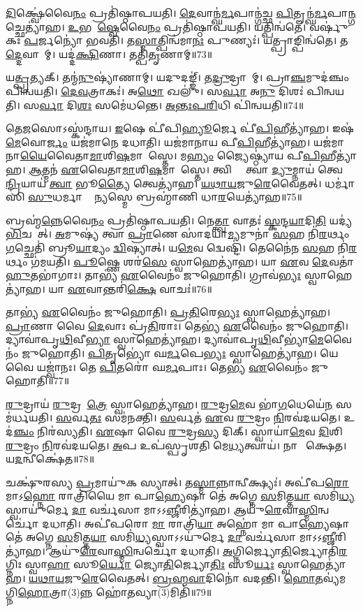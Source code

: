 \ul{𑌦𑌿}𑌕𑍍𑌷𑍍𑌵𑍇॑𑌵𑍈\ul{𑌨𑌂} 𑌪𑍍𑌰𑌤𑌿॑𑌷𑍍𑌠𑌾𑌪𑌯𑌤𑌿। 
\ul{𑌦𑍇}𑌵𑌾𑌨𑍍𑌘॑\ul{𑌰𑍍𑌮}𑌪𑌾𑌨𑍍𑌗॑𑌚𑍍𑌛 \ul{𑌪𑌿}𑌤𑍄𑌨𑍍𑌘॑\ul{𑌰𑍍𑌮}𑌪𑌾\ul{𑌨𑍍𑌗}𑌚𑍍𑌛𑍇\-𑌤𑍍𑌯𑌾॑𑌹। 
\ul{𑌉}𑌭𑌯𑍇᳚\ul{𑌷𑍍𑌵𑍇}𑌵𑍈\ul{𑌨𑌂} 𑌪𑍍𑌰𑌤𑌿॑𑌷𑍍𑌠𑌾𑌪𑌯𑌤𑌿। 
𑌯𑌤𑍍𑌪𑌿𑌨𑍍𑌵॑𑌤𑍇। 
𑌵𑌰𑍍\mbox{}𑌷𑍁॑𑌕𑌃 \ul{𑌪}𑌰𑍍𑌜𑌨𑍍𑌯𑍋॑ 𑌭𑌵𑌤𑌿। 
𑌤\ul{𑌸𑍍𑌮𑌾}𑌤𑍍𑌪𑌿𑌨𑍍𑌵॑𑌮𑌾\ul{𑌨𑌃} 𑌪𑍁𑌣𑍍𑌯𑌃॑। 
𑌯𑌤𑍍𑌪𑍍𑌰𑌾𑌙𑍍𑌪𑌿𑌨𑍍𑌵॑𑌤𑍇। 
𑌤\ul{𑌦𑍍𑌦𑍇}𑌵𑌾𑌨𑌾᳚𑌮𑍍। 
𑌯𑌦𑍍𑌦॑\ul{𑌕𑍍𑌷𑌿}𑌣𑌾। 
𑌤𑌤𑍍𑌪𑌿॑\ul{𑌤𑍃}𑌣𑌾𑌮𑍍॥73॥

𑌯\ul{𑌤𑍍𑌪𑍍𑌰}𑌤𑍍𑌯𑌕𑍍। 
𑌤𑌨𑍍𑌮॑\ul{𑌨𑍁}𑌷𑍍𑌯𑌾॑𑌣𑌾𑌮𑍍। 
𑌯𑌦𑍁𑌦𑌙𑍍𑌙𑍍॑। 
𑌤\ul{𑌦𑍍𑌰𑍁}𑌦𑍍𑌰𑌾𑌣𑌾᳚𑌮𑍍। 
𑌪𑍍𑌰𑌾\ul{𑌞𑍍𑌚}𑌮𑍁𑌦॑𑌞𑍍𑌚𑌂 𑌪𑌿𑌨𑍍𑌵𑌯𑌤𑌿। 
\ul{𑌦𑍇}\ul{𑌵}𑌤𑍍𑌰𑌾𑌕𑌃॑। 
𑌅\ul{𑌥𑍋} 𑌖𑌲𑍁॑। 
𑌸\ul{𑌰𑍍𑌵𑌾} 𑌅\ul{𑌨𑍁} 𑌦𑌿𑌶𑌃॑ 𑌪𑌿𑌨𑍍𑌵𑌯𑌤𑌿। 
𑌸\ul{𑌰𑍍𑌵𑌾} 𑌦𑌿\ul{𑌶𑌃} 𑌸𑌮𑍇॑𑌧𑌨𑍍𑌤𑍇। 
\ul{𑌅}\ul{𑌨𑍍𑌤𑌃}\ul{𑌪}\ul{𑌰𑌿}𑌧𑌿 𑌪𑌿॑𑌨𑍍𑌵𑌯𑌤𑌿॥74॥

𑌤𑍇\ul{𑌜}𑌸𑍋𑌽𑌸𑍍𑌕॑𑌨𑍍𑌦𑌾𑌯। 
\ul{𑌇}𑌷𑍇 𑌪𑍀॑𑌪𑌿\ul{𑌹𑍍𑌯𑍂}𑌰𑍍𑌜𑍇 𑌪𑍀॑\ul{𑌪𑌿}𑌹𑍀𑌤𑍍𑌯𑌾॑𑌹। 
𑌇𑌷॑\ul{𑌮𑍇}𑌵𑍋\ul{𑌰𑍍𑌜𑌂} 𑌯𑌜॑𑌮𑌾𑌨𑍇 𑌦𑌧𑌾𑌤𑌿। 
𑌯𑌜॑𑌮𑌾𑌨𑌾𑌯 𑌪𑍀\ul{𑌪𑌿}𑌹𑍀𑌤𑍍𑌯𑌾॑𑌹। 
𑌯𑌜॑𑌮𑌾𑌨𑌾\ul{𑌯𑍈}𑌵𑍈𑌤𑌾\ul{𑌮𑌾}𑌶𑌿\ul{𑌷}𑌮𑌾𑌶𑌾᳚𑌸𑍍𑌤𑍇। 
𑌮\ul{𑌹𑍍𑌯𑌂} 𑌜𑍍𑌯𑍈𑌷𑍍𑌠𑍍𑌯𑌾॑𑌯 𑌪𑍀\ul{𑌪𑌿}𑌹𑍀𑌤𑍍𑌯𑌾॑𑌹। 
\ul{𑌆}𑌤𑍍𑌮𑌨॑ \ul{𑌏}𑌵𑍈𑌤𑌾\ul{𑌮𑌾}𑌶𑌿\ul{𑌷}𑌮𑌾𑌶𑌾᳚𑌸𑍍𑌤𑍇। 
𑌤𑍍𑌵𑌿𑌷𑍍𑌯𑍈᳚ 𑌤𑍍𑌵𑌾 \ul{𑌦𑍍𑌯𑍁}𑌮𑍍𑌨𑌾𑌯॑ 𑌤𑍍𑌵𑍇\ul{𑌨𑍍𑌦𑍍𑌰𑌿}𑌯𑌾𑌯॑ \ul{𑌤𑍍𑌵𑌾} 𑌭𑍂\ul{𑌤𑍍𑌯𑍈} 𑌤𑍍𑌵𑍇𑌤𑍍𑌯𑌾॑𑌹। 
\ul{𑌯}\ul{𑌥𑌾}\ul{𑌯}𑌜𑍁\ul{𑌰𑍇}𑌵𑍈𑌤𑌤𑍍। 
𑌧𑌰𑍍𑌮𑌾॑𑌸𑌿 \ul{𑌸𑍁}𑌧𑌰𑍍𑌮𑌾 𑌮𑍇᳚ \ul{𑌨𑍍𑌯}𑌸𑍍𑌮𑍇 𑌬𑍍𑌰𑌹𑍍𑌮𑌾॑𑌣𑌿 𑌧𑌾\ul{𑌰}𑌯𑍇𑌤𑍍𑌯𑌾॑𑌹॥75॥

𑌬𑍍𑌰𑌹𑍍𑌮॑\ul{𑌨𑍍𑌨𑍇}𑌵𑍈\ul{𑌨𑌂} 𑌪𑍍𑌰𑌤𑌿॑𑌷𑍍𑌠𑌾𑌪𑌯𑌤𑌿। 
𑌨𑍇\ul{𑌤𑍍𑌤𑍍𑌵𑌾} 𑌵𑌾𑌤𑌃॑ \ul{𑌸𑍍𑌕}𑌨𑍍𑌦\ul{𑌯𑌾}𑌦𑌿\ul{𑌤𑌿} 𑌯𑌦𑍍𑌯॑\ul{𑌭𑌿}𑌚𑌰𑍇᳚𑌤𑍍। 
\ul{𑌅}𑌮𑍁𑌷𑍍𑌯॑ 𑌤𑍍𑌵𑌾 \ul{𑌪𑍍𑌰𑌾}𑌣𑍇 𑌸𑌾॑𑌦𑌯𑌾\ul{𑌮𑍍𑌯}𑌮𑍁𑌨𑌾॑ \ul{𑌸}𑌹 𑌨𑌿॑\ul{𑌰}𑌰𑍍𑌥𑌂 \ul{𑌗}𑌚𑍍𑌛𑍇𑌤𑌿॑ 𑌬𑍍𑌰𑍂\ul{𑌯𑌾}𑌦𑍍𑌯𑌂 \ul{𑌦𑍍𑌵𑌿}𑌷𑍍𑌯𑌾𑌤𑍍। 
𑌯\ul{𑌮𑍇}𑌵 𑌦𑍍𑌵𑍇𑌷𑍍𑌟𑌿॑। 
𑌤𑍇𑌨𑍈॑𑌨 \ul{𑌸}𑌹 𑌨𑌿॑\ul{𑌰}𑌰𑍍𑌥𑌂 𑌗॑𑌮𑌯𑌤𑌿। 
\ul{𑌪𑍂}𑌷𑍍𑌣𑍇 𑌶𑌰॑\ul{𑌸𑍇} 𑌸𑍍𑌵𑌾𑌹𑍇𑌤𑍍𑌯𑌾॑𑌹। 
𑌯𑌾 \ul{𑌏}𑌵 \ul{𑌦𑍇}𑌵𑌤𑌾॑ \ul{𑌹𑍁}𑌤𑌭𑌾॑𑌗𑌾𑌃। 
𑌤𑌾𑌭𑍍𑌯॑ \ul{𑌏}𑌵𑍈𑌨𑌂॑ 𑌜𑍁𑌹𑍋𑌤𑌿। 
𑌗𑍍𑌰𑌾𑌵॑\ul{𑌭𑍍𑌯𑌃} 𑌸𑍍𑌵𑌾𑌹𑍇𑌤𑍍𑌯𑌾॑𑌹। 
𑌯𑌾 \ul{𑌏}𑌵𑌾𑌨𑍍𑌤𑌰𑌿॑\ul{𑌕𑍍𑌷𑍇} 𑌵𑌾𑌚𑌃॑॥76॥

𑌤𑌾𑌭𑍍𑌯॑ \ul{𑌏}𑌵𑍈𑌨𑌂॑ 𑌜𑍁𑌹𑍋𑌤𑌿। 
\ul{𑌪𑍍𑌰}\ul{𑌤𑌿}𑌰𑍇\ul{𑌭𑍍𑌯𑌃} 𑌸𑍍𑌵𑌾𑌹𑍇𑌤𑍍𑌯𑌾॑𑌹। 
\ul{𑌪𑍍𑌰𑌾}𑌣𑌾 𑌵𑍈 \ul{𑌦𑍇}𑌵𑌾𑌃 𑌪𑍍𑌰॑\ul{𑌤𑌿}𑌰𑌾𑌃। 
𑌤𑍇𑌭𑍍𑌯॑ \ul{𑌏}𑌵𑍈𑌨𑌂॑ 𑌜𑍁𑌹𑍋𑌤𑌿। 
𑌦𑍍𑌯𑌾𑌵𑌾॑𑌪𑍃\ul{𑌥𑌿}𑌵𑍀\ul{𑌭𑍍𑌯𑌾}\ul{} 𑌸𑍍𑌵𑌾𑌹𑍇𑌤𑍍𑌯𑌾॑𑌹। 
𑌦𑍍𑌯𑌾𑌵𑌾॑𑌪𑍃\ul{𑌥𑌿}𑌵𑍀𑌭𑍍𑌯𑌾॑\ul{𑌮𑍇}𑌵𑍈𑌨𑌂॑ 𑌜𑍁𑌹𑍋𑌤𑌿। 
\ul{𑌪𑌿}𑌤𑍃𑌭𑍍𑌯𑍋॑ 𑌘\ul{𑌰𑍍𑌮}𑌪𑍇\ul{𑌭𑍍𑌯𑌃} 𑌸𑍍𑌵𑌾𑌹𑍇𑌤𑍍𑌯𑌾॑𑌹। 
𑌯𑍇 𑌵𑍈 𑌯𑌜𑍍𑌵𑌾॑𑌨𑌃। 
𑌤𑍇 \ul{𑌪𑌿}𑌤𑌰𑍋॑ 𑌘\ul{𑌰𑍍𑌮}𑌪𑌾𑌃। 
𑌤𑍇𑌭𑍍𑌯॑ \ul{𑌏}𑌵𑍈𑌨𑌂॑ 𑌜𑍁𑌹𑍋𑌤𑌿॥77॥

\ul{𑌰𑍁}𑌦𑍍𑌰𑌾𑌯॑ \ul{𑌰𑍁}𑌦𑍍𑌰𑌹𑍋᳚\ul{𑌤𑍍𑌰𑍇} 𑌸𑍍𑌵𑌾𑌹𑍇𑌤𑍍𑌯𑌾॑𑌹। 
\ul{𑌰𑍁}𑌦𑍍𑌰\ul{𑌮𑍇}𑌵 𑌭𑌾॑\ul{𑌗}𑌧𑍇𑌯𑍇॑\ul{𑌨} 𑌸𑌮॑𑌰𑍍𑌧𑌯𑌤𑌿। 
\ul{𑌸}𑌰𑍍𑌵\ul{𑌤𑌃} 𑌸𑌮॑𑌨𑌕𑍍𑌤𑌿। 
\ul{𑌸}𑌰𑍍𑌵𑌤॑ \ul{𑌏}𑌵 \ul{𑌰𑍁}𑌦𑍍𑌰𑌂 \ul{𑌨𑌿}𑌰𑌵॑𑌦𑌯𑌤𑍇। 
𑌉𑌦॑\ul{𑌞𑍍𑌚𑌂} 𑌨𑌿𑌰॑𑌸𑍍𑌯𑌤𑌿। 
\ul{𑌏}𑌷𑌾 𑌵𑍈 \ul{𑌰𑍁}𑌦𑍍𑌰\ul{𑌸𑍍𑌯} 𑌦𑌿𑌕𑍍। 
𑌸𑍍𑌵𑌾𑌯𑌾॑\ul{𑌮𑍇}𑌵 \ul{𑌦𑌿}𑌶𑌿 \ul{𑌰𑍁}𑌦𑍍𑌰𑌂 \ul{𑌨𑌿}𑌰𑌵॑𑌦𑌯𑌤𑍇। 
\ul{𑌅}𑌪 𑌉𑌪॑𑌸𑍍𑌪𑍃𑌶𑌤𑌿 𑌮𑍇\ul{𑌧𑍍𑌯}𑌤𑍍𑌵𑌾𑌯॑। 
𑌨𑌾𑌨𑍍𑌵𑍀᳚𑌕𑍍𑌷𑍇𑌤। 
𑌯\ul{𑌦}𑌨𑍍𑌵𑍀𑌕𑍍𑌷𑍇॑𑌤॥78॥

𑌚𑌕𑍍𑌷𑍁॑𑌰𑌸𑍍𑌯 \ul{𑌪𑍍𑌰}𑌮𑌾𑌯𑍁॑𑌕 𑌸𑍍𑌯𑌾𑌤𑍍। 
𑌤\ul{𑌸𑍍𑌮𑌾}𑌨𑍍𑌨𑌾𑌨𑍍𑌵𑍀𑌕𑍍𑌷𑍍𑌯𑌃॑। 
𑌅𑌪𑍀॑𑌪\ul{𑌰𑍋} 𑌮𑌾𑌽\ul{𑌹𑍍𑌨𑍋} 𑌰𑌾𑌤𑍍𑌰𑌿॑𑌯𑍈 𑌮𑌾 𑌪𑌾\ul{𑌹𑍍𑌯𑍇}𑌷𑌾 𑌤𑍇॑ 𑌅𑌗𑍍𑌨𑍇 \ul{𑌸}𑌮𑌿𑌤𑍍𑌤\ul{𑌯𑌾} 𑌸𑌮𑌿॑\ul{𑌧𑍍𑌯}𑌸𑍍𑌵𑌾𑌯𑍁॑𑌰𑍍𑌮𑍇 \ul{𑌦𑌾} 𑌵𑌰𑍍𑌚॑𑌸𑌾 𑌮𑌾𑌽𑌽\ul{𑌞𑍍𑌜𑍀}𑌰𑌿𑌤𑍍𑌯𑌾॑𑌹। 
𑌆𑌯𑍁॑\ul{𑌰𑍇}𑌵𑌾\ul{𑌸𑍍𑌮𑌿}𑌨𑍍𑌵𑌰𑍍𑌚𑍋॑ 𑌦𑌧𑌾𑌤𑌿। 
𑌅𑌪𑍀॑𑌪𑌰𑍋 \ul{𑌮𑌾} 𑌰𑌾𑌤𑍍𑌰𑌿॑\ul{𑌯𑌾} 𑌅𑌹𑍍𑌨𑍋॑ 𑌮𑌾 𑌪𑌾\ul{𑌹𑍍𑌯𑍇}𑌷𑌾 𑌤𑍇॑ 𑌅𑌗𑍍𑌨𑍇 \ul{𑌸}𑌮𑌿𑌤𑍍𑌤\ul{𑌯𑌾} 𑌸𑌮𑌿॑\ul{𑌧𑍍𑌯}𑌸𑍍𑌵𑌾𑌽𑌽𑌯𑍁॑𑌰𑍍𑌮𑍇 \ul{𑌦𑌾} 𑌵𑌰𑍍𑌚॑𑌸𑌾 𑌮𑌾𑌽𑌽\ul{𑌞𑍍𑌜𑍀}𑌰𑌿𑌤𑍍𑌯𑌾॑𑌹। 
𑌆𑌯𑍁॑\ul{𑌰𑍇}𑌵𑌾\ul{𑌸𑍍𑌮𑌿}𑌨𑍍𑌵𑌰𑍍𑌚𑍋॑ 𑌦𑌧𑌾𑌤𑌿। 
\ul{𑌅}𑌗𑍍𑌨𑌿𑌰𑍍𑌜𑍍𑌯𑍋\ul{𑌤𑌿}𑌰𑍍𑌜𑍍𑌯𑍋𑌤𑌿॑\ul{𑌰}𑌗𑍍𑌨𑌿𑌃 𑌸𑍍𑌵𑌾\ul{𑌹𑌾} 𑌸𑍂\ul{𑌰𑍍𑌯𑍋} 𑌜𑍍𑌯𑍋\ul{𑌤𑌿}𑌰𑍍𑌜𑍍𑌯𑍋\ul{𑌤𑌿𑌃} 𑌸𑍂\ul{𑌰𑍍𑌯𑌃} 𑌸𑍍𑌵𑌾𑌹𑍇𑌤𑍍𑌯𑌾॑𑌹। 
\ul{𑌯}\ul{𑌥𑌾}\ul{𑌯}𑌜𑍁\ul{𑌰𑍇}𑌵𑍈𑌤𑌤𑍍। 
\ul{𑌬𑍍𑌰}\ul{𑌹𑍍𑌮}\ul{𑌵𑌾}𑌦𑌿𑌨𑍋॑ 𑌵𑌦𑌨𑍍𑌤𑌿। 
\ul{𑌹𑍋}\ul{𑌤}𑌵𑍍𑌯॑𑌮𑌗𑍍𑌨𑌿\ul{𑌹𑍋}𑌤𑍍𑌰𑌾(3)𑌨𑍍𑌨 𑌹𑍋॑\ul{𑌤}𑌵𑍍𑌯𑌾(3)𑌮𑌿𑌤𑌿॑॥79॥

